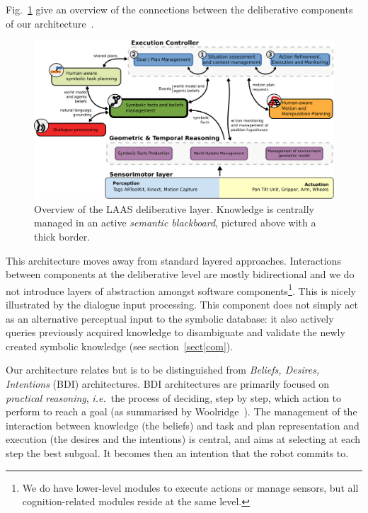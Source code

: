 \documentclass[letterpaper, 10 pt, conference]{ieeeconf}  %
\newcommand{\ie}{{\textit{i.e.\ }}}
\begin{document}
Fig.~\ref{fig|archi} give an overview of the connections between the
deliberative components of our architecture~\cite{Alami2011}.

\begin{figure}
        \centering
        \includegraphics[width=1.7\columnwidth]{archi}
        \caption{Overview of the LAAS deliberative layer. Knowledge is
        centrally managed in an active \emph{semantic blackboard}, pictured
        above with a thick border.}
        \label{fig|archi}
\end{figure}


This architecture moves away from standard layered approaches. Interactions
between components at the deliberative level are mostly bidirectional and we do
not introduce layers of abstraction amongst software components\footnote{We do
have lower-level modules to execute actions or manage sensors, but all
cognition-related modules reside at the same level.}. This is nicely
illustrated by the dialogue input processing. This component does not simply
act as an alternative perceptual input to the symbolic database: it also
actively queries previously acquired knowledge to disambiguate and validate the
newly created symbolic knowledge (see section~\ref{sect|com}).

Our architecture relates but is to be distinguished from \emph{Beliefs,
Desires, Intentions} (BDI) architectures. BDI architectures are primarily
focused on \emph{practical reasoning}, \ie the process of deciding, step by
step, which action to perform to reach a goal (as summarised by
Woolridge~\cite{Woolridge1999}). The management of the interaction between
knowledge (the beliefs) and task and plan representation and execution (the
desires and the intentions) is central, and aims at selecting at each step the
best subgoal. It becomes then an intention that the robot commits to.
\end{document}
